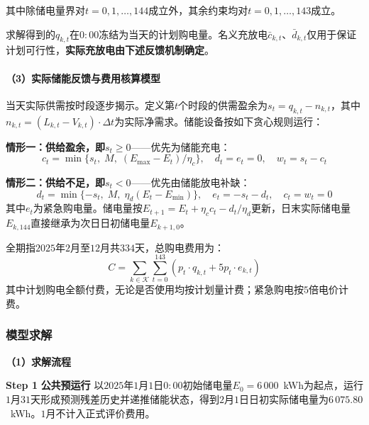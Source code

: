\documentclass[12pt,a4paper]{ctexart}
\theoremstyle{definition}
\theoremstyle{plain}
\theoremstyle{remark}
\newcommand{\step}[1]{\par\noindent\textbf{Step #1}\quad}
\begin{document}
\noindent 其中除储电量界对$t=0,1,\ldots,144$成立外，其余约束均对$t=0,1,\ldots,143$成立。

\noindent 求解得到的$q_{k,t}$在$0{:}00$冻结为当天的计划购电量。名义充放电$\bar{c}_{k,t}$、$\bar{d}_{k,t}$仅用于保证计划可行性，\textbf{实际充放电由下述反馈机制确定}。

\paragraph{（3）实际储能反馈与费用核算模型}

当天实际供需按时段逐步揭示。定义第$t$个时段的供需盈余为$s_t = q_{k,t} - n_{k,t}$，其中$n_{k,t} = (L_{k,t} - V_{k,t}) \cdot \Delta t$为实际净需求。储能设备按如下贪心规则运行：

\textbf{情形一：供给盈余，即$s_t \geq 0$}——优先为储能充电：
\begin{equation}
  c_t = \min\{s_t,\; M,\; (E_{\max} - E_t)/\eta_c\}, \quad d_t = e_t = 0, \quad w_t = s_t - c_t
  \label{eq:q2_surplus}
\end{equation}

\textbf{情形二：供给不足，即$s_t < 0$}——优先由储能放电补缺：
\begin{equation}
  d_t = \min\{-s_t,\; M,\; \eta_d(E_t - E_{\min})\}, \quad e_t = -s_t - d_t, \quad c_t = w_t = 0
  \label{eq:q2_deficit}
\end{equation}
\noindent 其中$e_t$为紧急购电量。储电量按$E_{t+1} = E_t + \eta_c c_t - d_t/\eta_d$更新，日末实际储电量$E_{k,144}$直接继承为次日日初储电量$E_{k+1,0}$。

全期指$2025$年$2$月至$12$月共$334$天，总购电费用为：
\begin{equation}
  C = \sum_{k \in \mathcal{K}} \sum_{t=0}^{143} \left( p_t \cdot q_{k,t} + 5 p_t \cdot e_{k,t} \right)
  \label{eq:q2_total_cost}
\end{equation}
\noindent 其中计划购电全额付费，无论是否使用均按计划量计费；紧急购电按$5$倍电价计费。

\subsubsection{模型求解}

\noindent\textbf{（1）求解流程}\\[6pt]

\step{1} \textbf{公共预运行} 以$2025$年$1$月$1$日$0{:}00$初始储电量$E_0 = 6\,000$~kWh为起点，运行$1$月$31$天形成预测残差历史并递推储能状态，得到$2$月$1$日日初实际储电量为$6\,075.80$~kWh。$1$月不计入正式评价费用。
\end{document}
